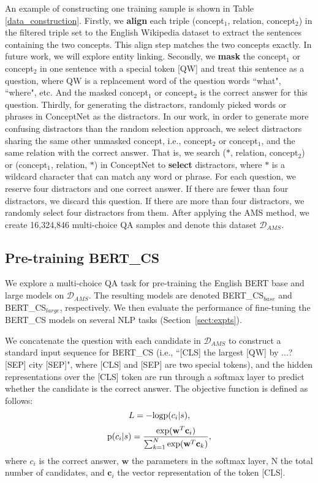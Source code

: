 \documentclass[11pt,a4paper]{article}
\begin{document}
An example of constructing one training sample is shown in Table \ref{data_construction}. Firstly, we \textbf{align} each triple (concept$_1$, relation, concept$_2$) in the filtered triple set to the English Wikipedia dataset to extract the sentences containing the two concepts. This align step matches the two concepts exactly. In future work, we will explore entity linking.
Secondly, we \textbf{mask} the concept$_1$ or concept$_2$ in one sentence with a special token [QW] and treat this sentence as a question, where QW is a replacement word of the question words ``what", ``where", etc.
And the masked concept$_1$ or concept$_2$ is the correct answer for this question.
Thirdly, for generating the distractors, \citet{sun2019probing} randomly picked words or phrases in ConceptNet as the distractors. In our work, in order to generate more confusing distractors than the random selection approach, we select distractors sharing the same other unmasked concept, i.e., concept$_2$ or concept$_1$, and the same relation with the correct answer.
That is, we search ($\ast$, relation, concept$_2$) or (concept$_1$, relation, $\ast$) in ConceptNet to \textbf{select} distractors, where $\ast$ is a wildcard character that can match any word or phrase.
For each question, we reserve four distractors and one correct answer.
If there are fewer than four distractors, we discard this question.  If there are more than four distractors, we randomly select four distractors from them. After applying the AMS method, we create 16,324,846 multi-choice QA samples and denote this dataset $\mathcal{D}_{AMS}$.


\subsection{Pre-training BERT\_CS}
\label{sect:pre-training}
We explore a multi-choice QA task for pre-training the English BERT base and large models on $\mathcal{D}_{AMS}$. The resulting models are denoted BERT\_CS$_{base}$ and BERT\_CS$_{large}$, respectively. 
We then evaluate the performance of fine-tuning the BERT\_CS models on several NLP tasks (Section~\ref{sect:expts}). 

We concatenate the question with each candidate in $\mathcal{D}_{AMS}$ to construct a standard input sequence for BERT\_CS (i.e., ``[CLS] the largest [QW] by ...? [SEP] city [SEP]", where [CLS] and [SEP] are two special tokens), and the hidden representations over the [CLS] token are run through a softmax layer to predict whether the candidate is the correct answer. The objective function is defined as follows:
\begin{equation}
L = - {\rm logp}(c_i|s),
\label{objective_function}
\end{equation}
\begin{equation}
{\rm p}(c_i|s) = \frac{{\rm exp}(\mathbf{w}^{T}\mathbf{c}_{i})}{\sum_{k=1}^{N}{\rm exp}(\mathbf{w}^{T}\mathbf{c}_{k})},
\label{prob}
\end{equation}
where $c_i$ is the correct answer, $\mathbf{w}$ the parameters in the softmax layer, N the total number of candidates, and $\mathbf{c}_i$ the vector representation of the token [CLS].
\end{document}
